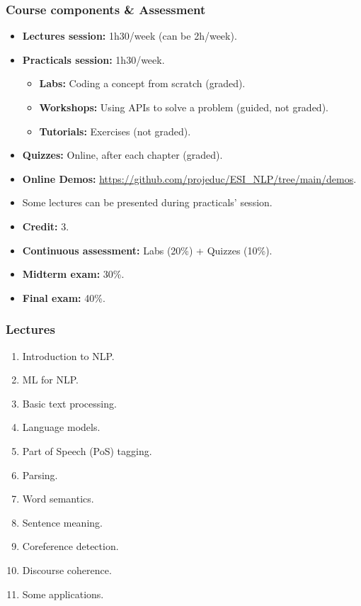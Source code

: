 \documentclass{beamer}
\begin{document}
\begin{frame}
\frametitle{Course components \& Assessment}

\begin{itemize}
	\item \textbf{Lectures session:} 1h30/week (can be 2h/week).
	\item \textbf{Practicals session:} 1h30/week.
	\begin{itemize}
		\item \textbf{Labs:} Coding a concept from scratch (graded).
		\item \textbf{Workshops:} Using APIs to solve a problem (guided, not graded).
		\item \textbf{Tutorials:} Exercises (not graded).
	\end{itemize}
	\item \textbf{Quizzes:} Online, after each chapter (graded).
	\item \textbf{Online Demos:} {\scriptsize\url{https://github.com/projeduc/ESI_NLP/tree/main/demos}}.
	\item Some lectures can be presented during practicals' session.
\end{itemize}

\vfill

\begin{itemize}
	\item \textbf{Credit:} 3.
	\item \textbf{Continuous assessment:} Labs (20\%) + Quizzes (10\%).
	\item \textbf{Midterm exam:} 30\%.
	\item \textbf{Final exam:} 40\%.
\end{itemize}

\end{frame}

\begin{frame}
\frametitle{Lectures}

\begin{enumerate}
	\item Introduction to NLP.
	\item ML for NLP.
	\item Basic text processing.
	\item Language models.
	\item Part of Speech (PoS) tagging.
	\item Parsing.
	\item Word semantics.
	\item Sentence meaning.
	\item Coreference detection.
	\item Discourse coherence.
	\item Some applications.
\end{enumerate}

\end{frame}
\end{document}
